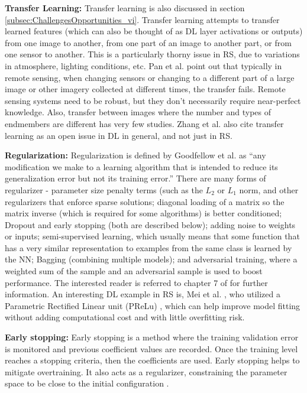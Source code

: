 \documentclass[12pt]{spieman}
\begin{document}
\begin{spacing}{1}
\textbf{Transfer Learning:} Transfer learning is also discussed in section \ref{subsec:ChallengesOpportunities_vi}. Transfer learning attempts to transfer learned features (which can also be thought of as DL layer activations or outputs) from one image to another, from one part of an image to another part, or from one sensor to another. This is a particularly thorny issue in RS, due to variations in atmosphere, lighting conditions, etc. Pan et al. \cite{pan2010survey} point out that typically in remote sensing, when changing sensors or changing to a different part of a large image or other imagery collected at different times, the transfer fails. Remote sensing systems need to be robust, but they don't necessarily require near-perfect knowledge. Also, transfer between images where the number and types of endmembers are different has very few studies. Zhang et al. \cite{Zhang2016} also cite transfer learning as an open issue in DL in general, and not just in RS.

\textbf{Regularization:} Regularization is defined by Goodfellow et al. \cite{goodfellow2016deep} as ``any modification we make to a learning algorithm that is intended to reduce its generalization error but not its training error.'' There are many forms of regularizer - parameter size penalty terms (such as the $L_{2}$ or $L_{1}$ norm, and other regularizers that enforce sparse solutions; diagonal loading of a matrix so the matrix inverse (which is required for some algorithms) is better conditioned; Dropout and early stopping (both are described below); adding noise to weights or inputs; semi-supervised learning, which usually means that some function that has a very similar representation to examples from the same class is learned by the NN; Bagging (combining multiple models); and adversarial training, where a weighted sum of the sample and an adversarial sample is used to boost performance. The interested reader is referred to chapter 7 of \cite{goodfellow2016deep} for further information. An interesting DL example in RS is, Mei et al. \cite{Mei2016Integrating} , who utilized a Parametric Rectified Linear unit (PReLu) \cite{he2015delving} , which can help improve model fitting without adding computational cost and with little overfitting risk.

\textbf{Early stopping:} Early stopping is a method where the training validation error is monitored and previous coefficient values are recorded. Once the training level reaches a stopping criteria, then the coefficients are used. Early stopping helps to mitigate overtraining. It also acts as a regularizer, constraining the parameter space to be close to the initial configuration \cite{Erhan2010} .


\end{spacing}
\end{document}
